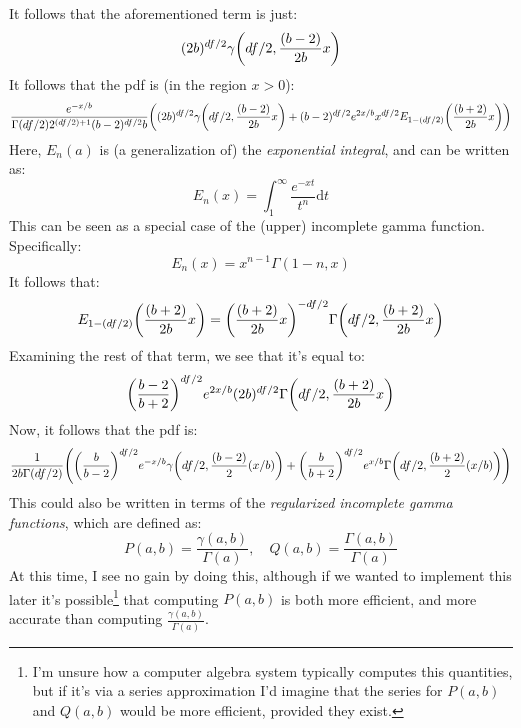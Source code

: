 \documentclass{article}
\begin{document}
It follows that the aforementioned term is just:
\begin{equation}
(2b)^{df/2}\gamma\pqty{df/2, \frac{(b-2)}{2b} x}
\end{equation}
It follows that the pdf is (in the region $x > 0$):
\begin{align*}
\frac{e^{-x/b}}{\Gamma(df/2)2^{(df/2)+1}(b-2)^{df/2}b}\pqty{(2b)^{df/2}\gamma\pqty{df/2,\frac{(b-2)}{2b}x} + (b-2)^{df/2}e^{2x/b}x^{df/2}E_{1-(df/2)}\pqty{\frac{(b+2)}{2b}x}}
\end{align*}
Here, $E_{n}(a)$ is (a generalization of) the \emph{exponential integral}, and can be written as:
\begin{equation}
E_{n}(x) = \int_1^\infty \frac{e^{-xt}}{t^n}\mathrm{d}t
\end{equation}
This can be seen as a special case of the (upper) incomplete gamma function.
Specifically:
\begin{equation}
E_n(x) = x^{n-1}\Gamma(1-n,x)
\end{equation}
It follows that:
\begin{equation}
E_{1-(df/2)}\pqty{\frac{(b+2)}{2b}x} = \pqty{\frac{(b+2)}{2b}x}^{-df/2}\Gamma\pqty{df/2,\frac{(b+2)}{2b}x}
\end{equation}
Examining the rest of that term, we see that it's equal to:
\begin{equation}
\pqty{\frac{b-2}{b+2}}^{df/2}e^{2x/b}(2b)^{df/2}\Gamma\pqty{df/2,\frac{(b+2)}{2b}x}
\end{equation}
Now, it follows that the pdf is:
\begin{equation}
\frac{1}{2b\Gamma(df/2)}\pqty{\pqty{\frac{b}{b-2}}^{df/2}e^{-x/b}\gamma\pqty{df/2,\frac{(b-2)}{2}(x/b)} + \pqty{\frac{b}{b+2}}^{df/2}e^{x/b}\Gamma\pqty{df/2,\frac{(b+2)}{2}(x/b)}}
\end{equation}
This could also be written in terms of the \emph{regularized incomplete gamma functions}, which are defined as:
\begin{equation}
P(a,b) = \frac{\gamma(a,b)}{\Gamma(a)},\quad Q(a,b) = \frac{\Gamma(a,b)}{\Gamma(a)}
\end{equation}
At this time, I see no gain by doing this, although if we wanted to implement this later it's possible\footnote{I'm unsure how a computer algebra system typically computes this quantities, but if it's via a series approximation I'd imagine that the series for $P(a,b)$ and $Q(a,b)$ would be more efficient, provided they exist.} that computing $P(a,b)$ is both more efficient, and more accurate than computing $\frac{\gamma(a,b)}{\Gamma(a)}$.
\end{document}
